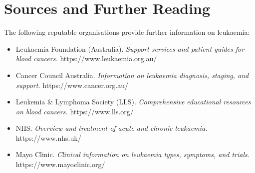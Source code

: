 \section*{Sources and Further Reading}
The following reputable organisations provide further information on leukaemia:
\begin{itemize}
    \item Leukaemia Foundation (Australia). \textit{Support services and patient guides for blood cancers.} https://www.leukaemia.org.au/
    \item Cancer Council Australia. \textit{Information on leukaemia diagnosis, staging, and support.} https://www.cancer.org.au/
    \item Leukemia \& Lymphoma Society (LLS). \textit{Comprehensive educational resources on blood cancers.} https://www.lls.org/
    \item NHS. \textit{Overview and treatment of acute and chronic leukaemia.} https://www.nhs.uk/
    \item Mayo Clinic. \textit{Clinical information on leukaemia types, symptoms, and trials.} https://www.mayoclinic.org/
\end{itemize}
